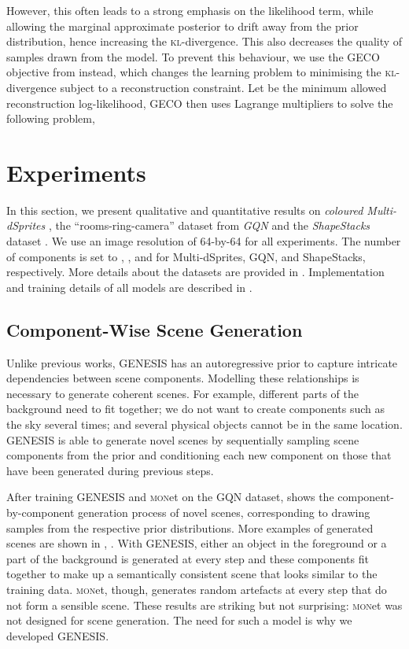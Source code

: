 \documentclass{article}
\begin{document}
However, this often leads to a strong emphasis on the likelihood term, while allowing the marginal approximate posterior  to drift away from the prior distribution, hence increasing the \textsc{kl}-divergence.
This also decreases the quality of samples drawn from the model.
To prevent this behaviour, we use the \gls{GECO} objective from \citet{rezende2018taming} instead, which changes the learning problem to minimising the \textsc{kl}-divergence subject to a reconstruction constraint.
Let  be the minimum allowed reconstruction log-likelihood, \gls{GECO} then uses Lagrange multipliers to solve the following problem,

 

\section{Experiments}
\label{sec:experimental_results}

In this section, we present qualitative and quantitative results on \emph{coloured Multi-dSprites} \citep{burgess2019monet}, the ``rooms-ring-camera'' dataset from \emph{GQN} \citep{eslami2018neural} and the \emph{ShapeStacks} dataset \citep{groth2018shapestacks}.
We use an image resolution of 64-by-64 for all experiments.
The number of components is set to , , and  for Multi-dSprites, GQN, and \mbox{ShapeStacks}, respectively.
More details about the datasets are provided in .
Implementation and training details of all models are described in .




\subsection{Component-Wise Scene Generation}

Unlike previous works, \gls{GENESIS} has an autoregressive prior to capture intricate dependencies between scene components.
Modelling these relationships is necessary to generate coherent scenes.
For example, different parts of the background need to fit together; we do not want to create components such as the sky several times; and several physical objects cannot be in the same location.
\gls{GENESIS} is able to generate novel scenes by sequentially sampling scene components from the prior and conditioning each new component on those that have been generated during previous steps.

After training \gls{GENESIS} and \textsc{mon}et on the GQN dataset,  shows the component-by-component generation process of novel scenes, corresponding to drawing samples from the respective prior distributions.
More examples of generated scenes are shown in , .
With \gls{GENESIS}, either an object in the foreground or a part of the background is generated at every step and these components fit together to make up a semantically consistent scene that looks similar to the training data.
\textsc{mon}et, though, generates random artefacts at every step that do not form a sensible scene. 
These results are striking but not surprising: \textsc{mon}et was not designed for scene generation. The need for such a model is why we developed \gls{GENESIS}.
\end{document}
